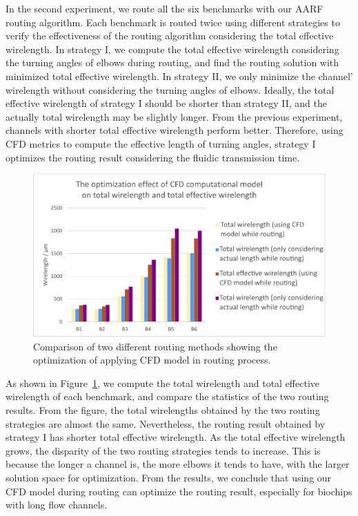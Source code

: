 \documentclass[journal]{IEEEtran}
\begin{document}
In the second experiment, we route all the six benchmarks with our AARF routing algorithm. 
Each benchmark is routed twice using different strategies to verify the effectiveness of the routing algorithm considering the total effective wirelength.
In strategy I, we compute the total effective wirelength considering the turning angles of elbows during routing, and find the routing solution with minimized total effective wirelength. 
In strategy II, we only minimize the channel' wirelength without considering the turning angles of elbows. 
Ideally, the total effective wirelength of strategy I should be shorter than strategy II, and the actually total wirelength may be slightly longer. 
From the previous experiment, channels with shorter total effective wirelength perform better. 
Therefore, using CFD metrics to compute the effective length of turning angles, strategy I optimizes the routing result considering the fluidic transmission time.

\begin{figure}
	\label{fig:opt}
	\centering
	\includegraphics[width=0.95\columnwidth, angle=0]{./Figs/optimization.pdf}
	\vspace{-0.2cm}
	\caption{Comparison of two different routing methods showing the optimization of applying CFD model in routing process.}
	\label{fig:opt}
\end{figure}

As shown in Figure~\ref{fig:opt}, we compute the total wirelength and total effective wirelength of each benchmark, and compare the statistics of the two routing results. 
From the figure, the total wirelengths obtained by the two routing strategies are almost the same. 
Nevertheless, the routing result obtained by strategy I has shorter total effective wirelength. 
As the total effective wirelength grows, the disparity of the two routing strategies tends to increase. 
This is because the longer a channel is, the more elbows it tends to have, with the larger solution space for optimization. 
From the results, we conclude that using our CFD model during routing can optimize the routing result, especially for biochips with long flow channels.
\end{document}
